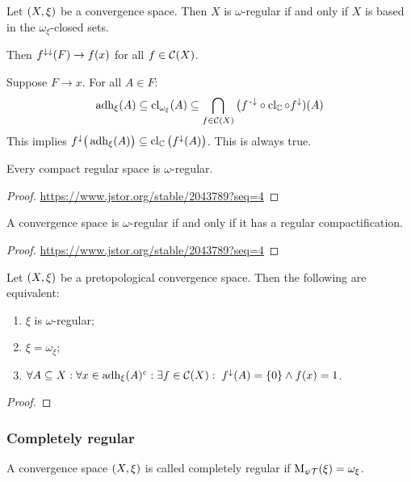 \begin{lemma}
Let $\sSet{X,\xi}$ be a convergence space. Then $X$ is $\omega$-regular \textup{if and only if} $X$ is based in the $\omega_\xi$-closed sets.
\end{lemma}

Then $f^{\downarrow\downarrow}(F) \to f(x)$ for all $f \in \operatorname{\mathcal{C}}(X)$.

Suppose $F\to x$. For all $A\in F$:
\[ \operatorname{adh}_\xi(A) \subseteq \operatorname{cl}_{\omega_\xi}(A) \subseteq \bigcap_{f\in \operatorname{\mathcal{C}}(X)} \big(f^{\text{\hspace{0.15em}-}\downarrow}\circ \operatorname{cl}_{\mathbb{C}} \circ f^\downarrow)(A) \]
This implies $f^\downarrow\big(\operatorname{adh}_\xi(A)\big) \subseteq \operatorname{cl}_{\mathbb{C}}\big(f^\downarrow(A)\big)$. This is always true.

\begin{proposition}
Every compact regular space is $\omega$-regular.
\end{proposition}
\begin{proof}
\url{https://www.jstor.org/stable/2043789?seq=4}
\end{proof}

\begin{proposition}
A convergence space is $\omega$-regular \textup{if and only if} it has a regular compactification.
\end{proposition}
\begin{proof}
\url{https://www.jstor.org/stable/2043789?seq=4}
\end{proof}

\begin{proposition}
Let $\sSet{X,\xi}$ be a pretopological convergence space. Then the following are equivalent:
\begin{enumerate}
\item $\xi$ is $\omega$-regular;
\item $\xi = \omega_\xi$;
\item $\forall A\subseteq X: \forall x\in \operatorname{adh}_\xi(A)^c: \exists f\in \operatorname{\mathcal{C}}(X): \; f^{\downarrow}(A) = \{0\} \land f(x) = 1$.
\end{enumerate}
\end{proposition}
\begin{proof}

\end{proof}


\subsubsection{Completely regular}
\begin{definition}
A convergence space $\sSet{X,\xi}$ is called completely regular if $\operatorname{M_{\psi\mathcal{T}}}(\xi) = \omega_\xi$.
\end{definition}

